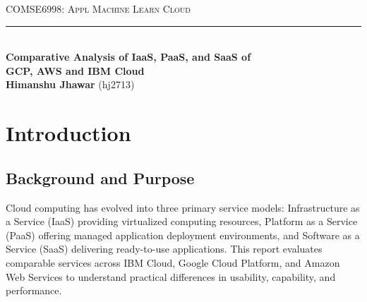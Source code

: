 \documentclass[11pt,a4paper]{article}
\begin{document}
\begin{center}
    \vspace*{0.5cm}
    {\large \textsc{COMSE6998: Appl Machine Learn Cloud}} \\[0.3em]
    \rule{\linewidth}{0.5mm} \\[0.4cm]
    {\Large \textbf{Comparative Analysis of IaaS, PaaS, and SaaS of}} \\[0.2em]
    {\Large \textbf{GCP, AWS and IBM Cloud}} \\[0.8cm]
    {\large \textbf{Himanshu Jhawar} (hj2713)} \\[0.5em]
    \vspace{-1.0em} %
\end{center}

\begin{abstract}
This report presents a hands on evaluation of cloud computing service models across three major vendors: IBM Cloud, Google Cloud Platform (GCP), and Amazon Web Services (AWS). As a first-time explorer of comprehensive cloud services beyond basic virtual machine creation, I examined one Infrastructure as a Service (IaaS), Platform as a Service (PaaS), and Software as a Service (SaaS) offering from each provider. The study focuses on usability from a Mac user's perspective, service creation performance, and the learning curve associated with each platform. Key observations include significant variation in onboarding complexity, with IBM Cloud requiring additional verification steps for student accounts, while GCP and AWS offered more streamlined registration processes. Performance metrics reveal distinct provisioning characteristics across service models, with IaaS generally requiring more configuration time than PaaS or SaaS alternatives.
\end{abstract}

\section{Introduction}

\subsection{Background and Purpose}
Cloud computing has evolved into three primary service models: Infrastructure as a Service (IaaS) providing virtualized computing resources, Platform as a Service (PaaS) offering managed application deployment environments, and Software as a Service (SaaS) delivering ready-to-use applications. This report evaluates comparable services across IBM Cloud, Google Cloud Platform, and Amazon Web Services to understand practical differences in usability, capability, and performance.
\end{document}
